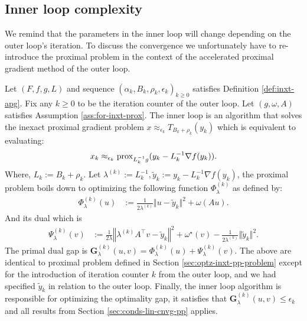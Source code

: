 \documentclass[12pt]{article}
\begin{document}
    \subsection{Inner loop complexity}
        We remind that the parameters in the inner loop will change depending on the outer loop's iteration. 
        To discuss the convergence we unfortunately have to re-introduce the proximal problem in the context of the accelerated proximal gradient method of the outer loop. 
        \par
        Let $(F, f, g, L)$ and sequence $(\alpha_k, B_k, \rho_k,\epsilon_k)_{k \ge0}$ satisfies Definition \ref{def:inxt-apg}. 
        Fix any $k \ge 0$ to be the iteration counter of the outer loop. 
        Let $(g, \omega, A)$ satisfies Assumption \ref{ass:for-inxt-prox}. 
        The inner loop is an algorithm that solves the inexact proximal gradient problem $x \approx_{\epsilon_k} T_{B_k + \rho_k}(y_k)$ which is equivalent to evaluating: 
        \begin{align*}
            x_k \approx_{\epsilon_k} \operatorname{prox}_{L_k^{-1} g}(y_k - L_k^{-1}\nabla f(y_k)).
        \end{align*}
        Where, $L_k := B_k + \rho_k$. 
        Let $\lambda^{(k)} := L_k^{-1}, \tilde y_k := y_k - L_k^{-1}\nabla f(y_k)$, the proximal problem boils down to optimizing the following function $\Phi_\lambda^{(k)}$ as defined by: 
        \begin{align}\label{eqn:primal-pp-k}
            \Phi_\lambda^{(k)}(u) &:= \frac{1}{2\lambda^{(k)}} \Vert u - \tilde y_k \Vert^2 + \omega(A u). 
        \end{align}
        And its dual which is 
        \begin{align}\label{eqn:dual-pp-k}
            \Psi_\lambda^{(k)}(v) &:=
            \frac{1}{2\lambda}
            \left\Vert \lambda^{(k)}A^\top v - \tilde y_k
            \right\Vert^2
            + \omega^\star(v) 
            - \frac{1}{2\lambda^{(k)}}\Vert \tilde y_k\Vert^2. 
        \end{align}
        The primal dual gap is $\mathbf G_\lambda^{(k)}(u, v) = \Phi_\lambda^{(k)}(u) + \Psi_\lambda^{(k)}(v)$. 
        The above are identical to proximal problem defined in Section \ref{sec:optz-inxt-pp-problem} except for the introduction of iteration counter $k$ from the outer loop, and we had specified $\tilde y_k$ in relation to the outer loop. 
        Finally, the inner loop algorithm is responsible for optimizing the optimality gap, it satisfies that $\mathbf G_\lambda^{(k)}(u, v) \le \epsilon_k$ and all results from Section \ref{sec:conds-lin-cnvg-pp} applies. 
\end{document}
